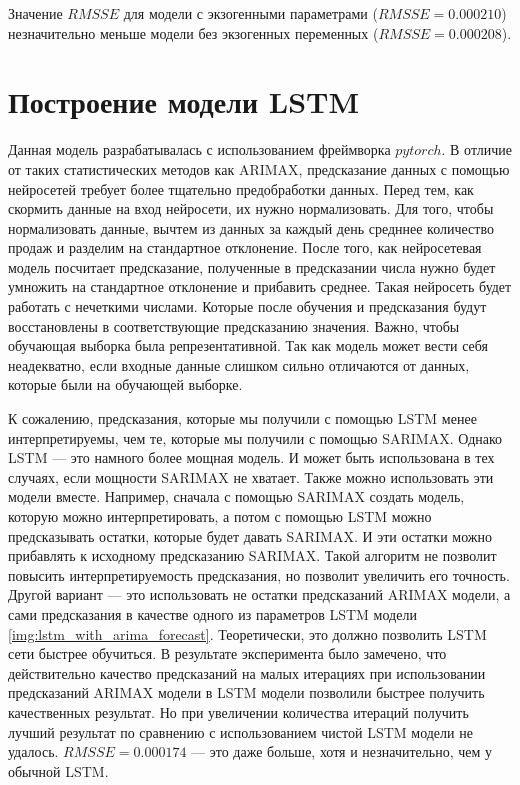 Значение $ RMSSE $ для модели с экзогенными параметрами ($ RMSSE = 0.000210 $) незначительно меньше
модели без экзогенных переменных ($ RMSSE = 0.000208 $).


\section{Построение модели LSTM}

Данная модель разрабатывалась с использованием фреймворка $ pytorch $.
В отличие от таких статистических методов как ARIMAX, предсказание данных
с помощью нейросетей требует более тщательно предобработки данных.
Перед тем, как скормить данные на вход нейросети, их нужно нормализовать.
Для того, чтобы нормализовать данные, вычтем из данных за каждый день средннее
количество продаж и разделим на стандартное отклонение. После того, как
нейросетевая модель посчитает предсказание, полученные в предсказании
числа нужно будет умножить на стандартное отклонение и прибавить среднее.
Такая нейросеть будет работать с нечеткими числами. Которые после обучения
и предсказания будут восстановлены в соответствующие предсказанию значения.
Важно, чтобы обучающая выборка была репрезентативной. Так как модель
может вести себя неадекватно, если входные данные слишком сильно отличаются
от данных, которые были на обучающей выборке.

К сожалению, предсказания, которые мы получили с помощью  LSTM менее интерпретируемы,
чем те, которые мы получили с помощью SARIMAX. Однако LSTM --- это намного более
мощная модель. И может быть использована в тех случаях, если мощности SARIMAX не хватает.
Также можно использовать эти модели вместе. Например, сначала с помощью SARIMAX создать
модель, которую можно интерпретировать, а потом с помощью LSTM можно предсказывать остатки, которые будет
давать SARIMAX. И эти остатки можно прибавлять к исходному предсказанию SARIMAX. Такой алгоритм
не позволит повысить интерпретируемость предсказания, но позволит увеличить его точность.
Другой вариант --- это использовать не остатки предсказаний ARIMAX модели, а
сами предсказания в качестве одного из параметров LSTM модели \ref{img:lstm_with_arima_forecast}.
Теоретически, это должно позволить LSTM сети быстрее обучиться.
В результате эксперимента было замечено, что действительно качество предсказаний
на малых итерациях при использовании предсказаний ARIMAX модели в LSTM модели
позволили быстрее получить качественных результат. Но при увеличении количества итераций
получить лучший результат по сравнению с использованием чистой LSTM модели не удалось.
$ RMSSE = 0.000174 $ --- это даже больше, хотя и незначительно, чем у обычной LSTM.

